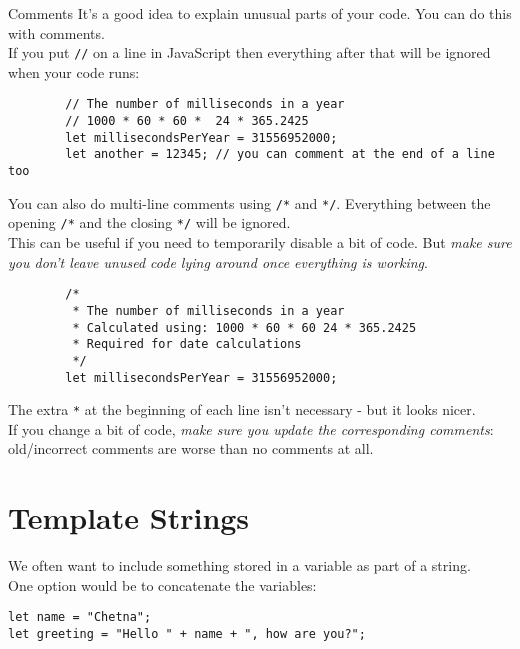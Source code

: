 \begin{infobox}{Comments}
    It's a good idea to explain unusual parts of your code. You can do this with comments.
    \\

    If you put \texttt{//} on a line in JavaScript then everything after that will be ignored when your code runs:

    \begin{verbatim}
        // The number of milliseconds in a year
        // 1000 * 60 * 60 *  24 * 365.2425
        let millisecondsPerYear = 31556952000;
        let another = 12345; // you can comment at the end of a line too
    \end{verbatim}

    You can also do multi-line comments using \texttt{/*} and \texttt{*/}. Everything between the opening \texttt{/*} and the closing \texttt{*/} will be ignored.
    \\

    This can be useful if you need to temporarily disable a bit of code. But \textit{make sure you don't leave unused code lying around once everything is working}.

    \begin{verbatim}
        /*
         * The number of milliseconds in a year
         * Calculated using: 1000 * 60 * 60 24 * 365.2425
         * Required for date calculations
         */
        let millisecondsPerYear = 31556952000;
    \end{verbatim}

    The extra \texttt{*} at the beginning of each line isn't necessary - but it looks nicer.
    \\

    If you change a bit of code, \textit{make sure you update the corresponding comments}: old/incorrect comments are worse than no comments at all.
\end{infobox}

\pagebreak

\section{Template Strings}

We often want to include something stored in a variable as part of a string.
\\

One option would be to concatenate the variables:

\begin{verbatim}
let name = "Chetna";
let greeting = "Hello " + name + ", how are you?";
\end{verbatim}

